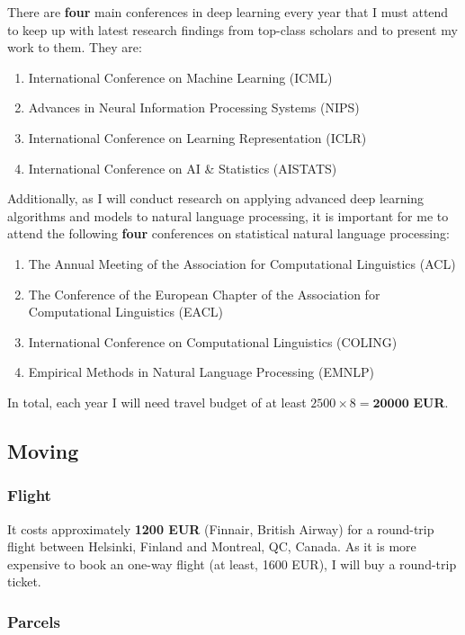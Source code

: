 \documentclass[11pt, oneside]{essay}
\begin{document}
There are \textbf{four} main conferences in deep learning every
year that I must attend to keep up with latest research findings
from top-class scholars and to present my work to them. They are:
\begin{enumerate}
    \item International Conference on Machine Learning (ICML)
    \item Advances in Neural Information Processing Systems (NIPS)
    \item International Conference on Learning Representation (ICLR)
    \item International Conference on AI \& Statistics (AISTATS)
\end{enumerate}

Additionally, as I will conduct research on applying advanced
deep learning algorithms and models to natural language
processing, it is important for me to attend the following
\textbf{four} conferences on statistical natural language processing:
\begin{enumerate}
    \item The Annual Meeting of the Association for Computational Linguistics (ACL)
    \item The Conference of the European Chapter of the
    Association for Computational Linguistics (EACL)
    \item International Conference on Computational Linguistics (COLING)
    \item Empirical Methods in Natural Language Processing (EMNLP)
\end{enumerate}

In total, each year I will need travel budget of at least $2500
\times 8 = \mathbf{20000}$ \textbf{EUR}.


\subsection{Moving}

\subsubsection{Flight}

It costs approximately \textbf{1200 EUR} (Finnair, British
Airway) for a round-trip flight between Helsinki, Finland
and Montreal, QC, Canada. As it is more expensive to book an
one-way flight (at least, 1600 EUR), I will buy a round-trip
ticket.

\subsubsection{Parcels}
\end{document}
